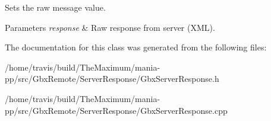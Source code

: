 Sets the raw message value. 


\begin{DoxyParams}{Parameters}
{\em response} & Raw response from server (X\-M\-L). \\
\hline
\end{DoxyParams}


The documentation for this class was generated from the following files\-:\begin{DoxyCompactItemize}
\item 
/home/travis/build/\-The\-Maximum/mania-\/pp/src/\-Gbx\-Remote/\-Server\-Response/Gbx\-Server\-Response.\-h\item 
/home/travis/build/\-The\-Maximum/mania-\/pp/src/\-Gbx\-Remote/\-Server\-Response/Gbx\-Server\-Response.\-cpp\end{DoxyCompactItemize}

